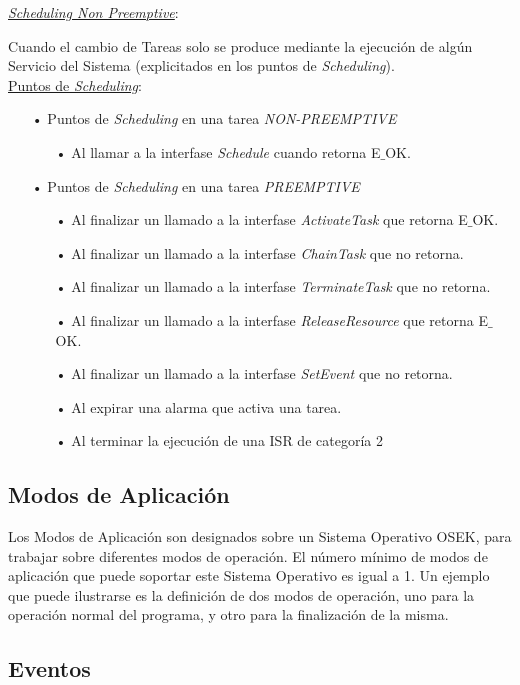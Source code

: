 \documentclass[12pt,letterpaper]{article}
\begin{document}
\underline{\textit{Scheduling Non Preemptive}}:

Cuando el cambio de Tareas solo se produce mediante la ejecución de algún Servicio del Sistema (explicitados en los puntos de \textit{Scheduling}).
 \\
 
\underline{Puntos de \textit{Scheduling}}:

\begin{enumerate}
\item[•]Puntos de \textit{Scheduling} en una tarea \textit{NON-PREEMPTIVE}
\begin{enumerate}
\item[•]Al llamar a la interfase \textit{Schedule} cuando retorna E$\_$OK.
\end{enumerate}
\item[•]Puntos de \textit{Scheduling} en una tarea \textit{PREEMPTIVE}
\begin{enumerate}
\item[•]Al finalizar un llamado a la interfase \textit{ActivateTask} que retorna E$\_$OK.
\item[•]Al finalizar un llamado a la interfase \textit{ChainTask} que no retorna.
\item[•]Al finalizar un llamado a la interfase \textit{TerminateTask} que no retorna.
\item[•]Al finalizar un llamado a la interfase \textit{ReleaseResource} que retorna E$\_$OK.
\item[•]Al finalizar un llamado a la interfase \textit{SetEvent} que no retorna.
\item[•]Al expirar una alarma que activa una tarea.
\item[•]Al terminar la ejecución de una ISR de categoría 2
\end{enumerate}
\end{enumerate} 

\subsection{Modos de Aplicación}
Los Modos de Aplicación son designados sobre un Sistema Operativo OSEK, para trabajar sobre diferentes modos de operación. El número mínimo de modos de aplicación que puede soportar este Sistema Operativo es igual a 1. Un ejemplo que puede ilustrarse es la definición de dos modos de operación, uno para la operación normal del programa, y otro para la finalización de la misma.

\subsection{Eventos}
\end{document}
